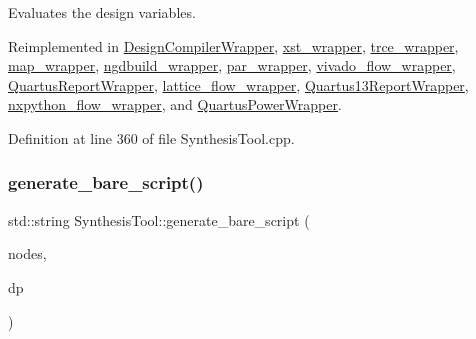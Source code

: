 Evaluates the design variables. 



Reimplemented in \hyperlink{classDesignCompilerWrapper_aab1d39b4695cbed4825c1154118e1bef}{Design\+Compiler\+Wrapper}, \hyperlink{classxst__wrapper_a435ee7658a8245fbee5a7b2f872d0947}{xst\+\_\+wrapper}, \hyperlink{classtrce__wrapper_a6a71a4bfee47d27d903b4f70977eb758}{trce\+\_\+wrapper}, \hyperlink{classmap__wrapper_a29c46af244f668b538b47e01ac870d01}{map\+\_\+wrapper}, \hyperlink{classngdbuild__wrapper_acda360ce75b71e1056a3e30841649f0c}{ngdbuild\+\_\+wrapper}, \hyperlink{classpar__wrapper_a9713765d1906b815c3eb4d84804fdc85}{par\+\_\+wrapper}, \hyperlink{classvivado__flow__wrapper_a53ba0a2d08c3313f7ca81b9679547cc1}{vivado\+\_\+flow\+\_\+wrapper}, \hyperlink{classQuartusReportWrapper_a71622a41d39325f2595a06f60415016c}{Quartus\+Report\+Wrapper}, \hyperlink{classlattice__flow__wrapper_a731ddad3888b81665926537dfe415269}{lattice\+\_\+flow\+\_\+wrapper}, \hyperlink{classQuartus13ReportWrapper_af36c7735f63c651ab56d49e6cb620310}{Quartus13\+Report\+Wrapper}, \hyperlink{classnxpython__flow__wrapper_a25d952c9a75e7ecd453fc0334625b312}{nxpython\+\_\+flow\+\_\+wrapper}, and \hyperlink{classQuartusPowerWrapper_aaa19cb276729799877bb401734c0a0fa}{Quartus\+Power\+Wrapper}.



Definition at line 360 of file Synthesis\+Tool.\+cpp.

\mbox{\label{classSynthesisTool_aae5bc9b3dc0428681da3a31ef6566c93}} 
\subsubsection{\texorpdfstring{generate\+\_\+bare\+\_\+script()}{generate\_bare\_script()}}
{\footnotesize\ttfamily std\+::string Synthesis\+Tool\+::generate\+\_\+bare\+\_\+script (\begin{DoxyParamCaption}\item[{const std\+::vector$<$ \hyperlink{xml__script__command_8hpp_a1fe3d50ade66bc35e41be9b68bbbcd02}{xml\+\_\+script\+\_\+node\+\_\+t\+Ref} $>$ \&}]{nodes,  }\item[{const \hyperlink{DesignParameters_8hpp_ae36bb1c4c9150d0eeecfe1f96f42d157}{Design\+Parameters\+Ref} \&}]{dp }\end{DoxyParamCaption})}

